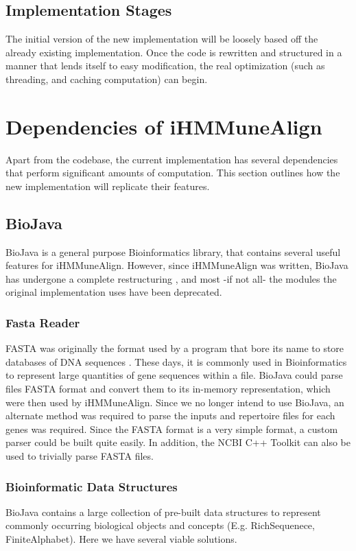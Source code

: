 \documentclass[a4paper,12pt]{report}
\begin{document}
\subsection{Implementation Stages}
The initial version of the new implementation will be loosely based off the already existing implementation. Once the code is rewritten and structured in a manner that lends itself to easy modification, the real optimization (such as threading, and caching computation) can begin.

\section{Dependencies of iHMMuneAlign}
Apart from the codebase, the current implementation has several dependencies that perform significant amounts of computation. This section outlines how the new implementation will replicate their features.

\subsection{BioJava}
BioJava \autocite{biojava}is a general purpose Bioinformatics library, that contains several useful features for iHMMuneAlign. However, since iHMMuneAlign was written, BioJava has undergone a complete restructuring \autocite{biojava3}, and most -if not all- the modules the original implementation uses have been deprecated.

\subsubsection{Fasta Reader}
FASTA was originally the format used by a program that bore its name to store databases of DNA sequences \autocite{fasta}. These days, it is commonly used in Bioinformatics to represent large quantities of gene sequences within a file. BioJava could parse files FASTA format and convert them to its in-memory representation, which were then used by iHMMuneAlign. Since we no longer intend to use BioJava, an alternate method was required to parse the inputs and repertoire files for each genes was required. Since the FASTA format is a very simple format, a custom parser could be built quite easily. In addition, the NCBI C++ Toolkit \autocite{ncbi-fasta} can also be used to trivially parse FASTA files.

\subsubsection{Bioinformatic Data Structures}
BioJava contains a large collection of pre-built data structures to represent commonly occurring biological objects and concepts (E.g. RichSequenece, FiniteAlphabet). Here we have several viable solutions.
\end{document}
